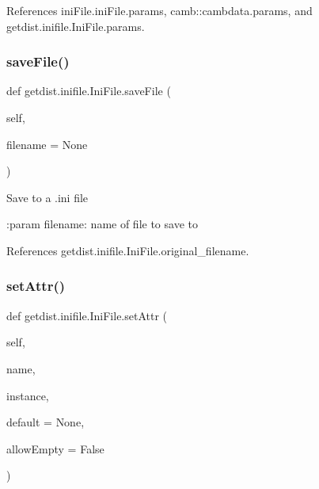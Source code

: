 References ini\+File.\+ini\+File.\+params, camb\+::cambdata.\+params, and getdist.\+inifile.\+Ini\+File.\+params.

\mbox{\label{classgetdist_1_1inifile_1_1IniFile_ad61dd576303028a9327f483e5fe55c6e}} 
\subsubsection{\texorpdfstring{save\+File()}{saveFile()}}
{\footnotesize\ttfamily def getdist.\+inifile.\+Ini\+File.\+save\+File (\begin{DoxyParamCaption}\item[{}]{self,  }\item[{}]{filename = {\ttfamily None} }\end{DoxyParamCaption})}

\begin{DoxyVerb}Save to a .ini file

:param filename:  name of file to save to
\end{DoxyVerb}
 

References getdist.\+inifile.\+Ini\+File.\+original\+\_\+filename.

\mbox{\label{classgetdist_1_1inifile_1_1IniFile_ab0aec3357b710594c342466f6c12762a}} 
\subsubsection{\texorpdfstring{set\+Attr()}{setAttr()}}
{\footnotesize\ttfamily def getdist.\+inifile.\+Ini\+File.\+set\+Attr (\begin{DoxyParamCaption}\item[{}]{self,  }\item[{}]{name,  }\item[{}]{instance,  }\item[{}]{default = {\ttfamily None},  }\item[{}]{allow\+Empty = {\ttfamily False} }\end{DoxyParamCaption})}

